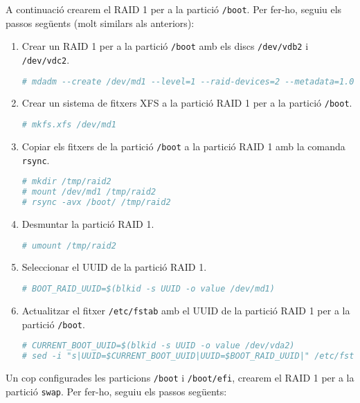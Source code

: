 A continuació crearem el RAID 1 per a la partició \texttt{/boot}. Per fer-ho, seguiu els passos següents (molt similars als anteriors):

\begin{enumerate}
        \item Crear un RAID 1 per a la partició \texttt{/boot} amb els discs \texttt{/dev/vdb2} i \texttt{/dev/vdc2}.
\begin{lstlisting}[language=bash, numbers=none, commentstyle=\color{black}]
# mdadm --create /dev/md1 --level=1 --raid-devices=2 --metadata=1.0 /dev/vdb2 /dev/vdc2
\end{lstlisting}
        \item Crear un sistema de fitxers XFS a la partició RAID 1 per a la partició \texttt{/boot}.
\begin{lstlisting}[language=bash, numbers=none, commentstyle=\color{black}]
# mkfs.xfs /dev/md1
\end{lstlisting}
        \item Copiar els fitxers de la partició \texttt{/boot} a la partició RAID 1 amb la comanda \texttt{rsync}.
\begin{lstlisting}[language=bash, numbers=none, commentstyle=\color{black}]
# mkdir /tmp/raid2
# mount /dev/md1 /tmp/raid2
# rsync -avx /boot/ /tmp/raid2
\end{lstlisting}
        \item Desmuntar la partició RAID 1.
\begin{lstlisting}[language=bash, numbers=none, commentstyle=\color{black}]
# umount /tmp/raid2
\end{lstlisting}
        \item Seleccionar el UUID de la partició RAID 1.
\begin{lstlisting}[language=bash, numbers=none, commentstyle=\color{black}]
# BOOT_RAID_UUID=$(blkid -s UUID -o value /dev/md1)
\end{lstlisting}
        \item Actualitzar el fitxer \texttt{/etc/fstab} amb el UUID de la partició RAID 1 per a la partició \texttt{/boot}.
\begin{lstlisting}[language=bash, numbers=none, commentstyle=\color{black}]
# CURRENT_BOOT_UUID=$(blkid -s UUID -o value /dev/vda2)
# sed -i "s|UUID=$CURRENT_BOOT_UUID|UUID=$BOOT_RAID_UUID|" /etc/fstab
\end{lstlisting}
\end{enumerate}

Un cop configurades les particions \texttt{/boot} i \texttt{/boot/efi}, crearem el RAID 1 per a la partició \texttt{swap}. Per fer-ho, seguiu els passos següents:

